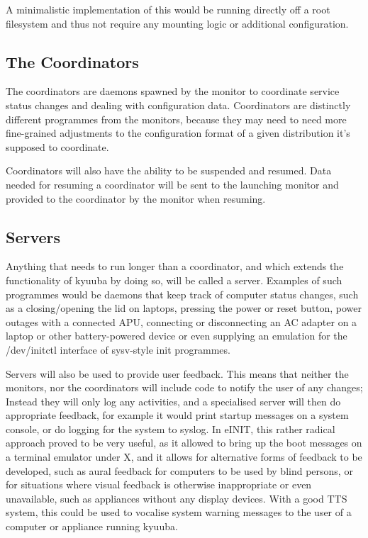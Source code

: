 \documentclass[a4paper,twoside,titlepage]{article}
\begin{document}
A minimalistic implementation of this would be running directly off a root
filesystem and thus not require any mounting logic or additional configuration.

\subsection{The Coordinators}
The coordinators are daemons spawned by the monitor to coordinate service status
changes and dealing with configuration data. Coordinators are distinctly
different programmes from the monitors, because they may need to need more
fine-grained adjustments to the configuration format of a given distribution
it's supposed to coordinate.

Coordinators will also have the ability to be suspended and resumed. Data needed
for resuming a coordinator will be sent to the launching monitor and provided to
the coordinator by the monitor when resuming.

\subsection{Servers}
Anything that needs to run longer than a coordinator, and which extends the
functionality of kyuuba by doing so, will be called a server. Examples of such
programmes would be daemons that keep track of computer status changes, such as
a closing/opening the lid on laptops, pressing the power or reset button, power
outages with a connected APU, connecting or disconnecting an AC adapter on a
laptop or other battery-powered device or even supplying an emulation for the
/dev/initctl interface of sysv-style init programmes.

Servers will also be used to provide user feedback. This means that neither the
monitors, nor the coordinators will include code to notify the user of any
changes; Instead they will only log any activities, and a specialised server
will then do appropriate feedback, for example it would print startup messages
on a system console, or do logging for the system to syslog. In eINIT, this
rather radical approach proved to be very useful, as it allowed to bring up the
boot messages on a terminal emulator under X, and it allows for alternative
forms of feedback to be developed, such as aural feedback for computers to be
used by blind persons, or for situations where visual feedback is otherwise
inappropriate or even unavailable, such as appliances without any display
devices. With a good TTS system, this could be used to vocalise system warning
messages to the user of a computer or appliance running kyuuba.
\end{document}

